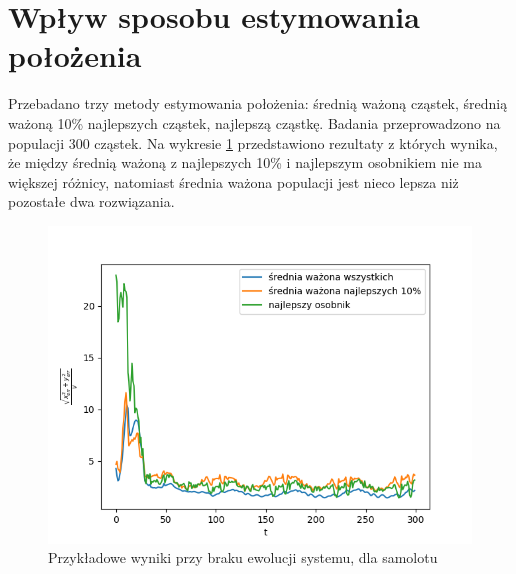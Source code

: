 
\section{Wpływ sposobu estymowania położenia}
Przebadano trzy metody estymowania położenia: średnią ważoną cząstek, średnią ważoną 10\% najlepszych cząstek, najlepszą cząstkę. Badania przeprowadzono na populacji 300 cząstek. Na wykresie \ref{wplyw_est} przedstawiono rezultaty z których wynika, że między średnią ważoną z najlepszych 10\% i najlepszym osobnikiem nie ma większej różnicy, natomiast średnia ważona populacji jest nieco lepsza niż pozostałe dwa rozwiązania.

\begin{figure}[H]
	\begin{center}
		\includegraphics[width=12cm]{./wplyw_est.png}
		\caption{Przykładowe wyniki przy braku ewolucji systemu, dla samolotu}
		\label{wplyw_est}
	\end{center}
\end{figure}


